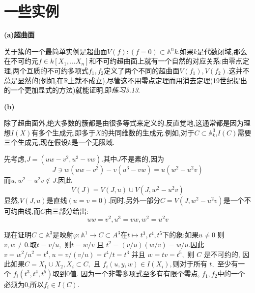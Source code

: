 \documentclass[UTF8]{book}
\begin{document}
		
	\section{一些实例}
		\textbf{(a)超曲面}
		
		
		关于簇的一个最简单实例是超曲面$V (f ):(f =0) \subset \mathbb{A} ^{ n } k$.如果$ k $是代数闭域,那么在不可约元$f \in k \left[ X _{1}, \dots X _{ n }\right]$和不可约超曲面上就有一个自然的对应关系:由零点定理,两个互质的不可约多项式$ f_{1},f_{2} $定义了两个不同的超曲面$ V(f_{1}),V(f_{2}) $.这并不总是显然的(例如,在$ \mathbb{R} $上就不成立),尽管这不用零点定理而用消去定理(19世纪提出的一个更加显式的方法)就能证明,即\textit{练习3.13}.
		
		
		\textbf{(b)}
		
		
		除了超曲面外,绝大多数的簇都是由很多等式来定义的.反直觉地,这通常都是因为理想$ I(X) $有多个生成元,即多于$ X $的共同维数的生成元.例如,对于$C \subset \mathbb{A} ^{3} _{k}$,$ I(C) $需要三个生成元,现在假设$ k $是一个无限域.
		
		
		先考虑,$J =\left(uw - v ^{2}, u ^{3}- vw \right)$.其中$ J$不是素的,因为
		\begin{equation*}
		 J \ni w \left(uw - v ^{2}\right)- v \left(u ^{3}- v w \right)= u \left(w ^{2}- u ^{2} v \right)
		\end{equation*}
		 而$ u , w ^{2}- u ^{2} v \notin J $.因此
		 \begin{equation*}
		 	V (J )= V (J , u ) \cup V \left(J , w ^{2}- u ^{2} v \right)
		 \end{equation*}
		 显然,$ V (J , u ) $是直线$ (u = v =0) $.同时,另外一部分$  C = V \left(J , w ^{2}- u ^{2} v \right)$是一个不可约曲线,而$ C $由三部分给出:
		 \begin{equation*}
		 	uw = v ^{2}, u ^{3}= vw , w ^{2}= u ^{2} v
		 \end{equation*}
		
		
		现在证明$C \subset \mathbb{A} ^{3}$是映射$\varphi: \mathbb{A} ^{1} \rightarrow C \subset A ^{3}$在$t \mapsto t^{3}, t^{4}, t^{5}$下的象:如果$u \neq 0$ 则 $v, w \neq 0 .$取$t=v / u,$ 则$t=w / v $ 且 $t ^{2}=(v / u )(w / v )= w / u .$因此$v = w ^{2} / u ^{2}= t ^{4}, u = v /(v / u )= t ^{4} / t = t ^{3} $ 并且
		$w = tv = t ^{5},$ 则 $C$ 是不可约的, 因此如果$C = X _{1} \cup X _{2}, X _{ i } \subset C ,$ 且 $f _{ i }(u , y , w ) \in I \left(X _{ i }\right),$则对于所有 $t ,$ 至少有一个 $f _{ i }\left(t ^{3}, t ^{4}, t ^{5}\right)$取到0值. 因为一个非零多项式至多有有限个零点, $f_{1}, f_{2}$中的一个必须为0,所以$f _{ i } \in I (C )$.
		
\end{document}
